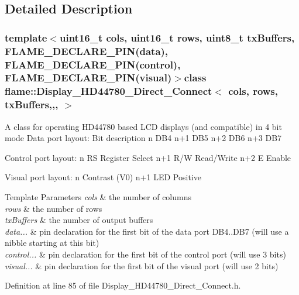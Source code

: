 \subsection{Detailed Description}
\subsubsection*{template$<$uint16\-\_\-t cols, uint16\-\_\-t rows, uint8\-\_\-t tx\-Buffers, F\-L\-A\-M\-E\-\_\-\-D\-E\-C\-L\-A\-R\-E\-\_\-\-P\-I\-N(data), F\-L\-A\-M\-E\-\_\-\-D\-E\-C\-L\-A\-R\-E\-\_\-\-P\-I\-N(control), F\-L\-A\-M\-E\-\_\-\-D\-E\-C\-L\-A\-R\-E\-\_\-\-P\-I\-N(visual)$>$class flame\-::\-Display\-\_\-\-H\-D44780\-\_\-\-Direct\-\_\-\-Connect$<$ cols, rows, tx\-Buffers,,, $>$}

A class for operating H\-D44780 based L\-C\-D displays (and compatible) in 4 bit mode Data port layout\-: Bit description n D\-B4 n+1 D\-B5 n+2 D\-B6 n+3 D\-B7

Control port layout\-: n R\-S Register Select n+1 R/\-W Read/\-Write n+2 E Enable

Visual port layout\-: n Contrast (V0) n+1 L\-E\-D Positive


\begin{DoxyTemplParams}{Template Parameters}
{\em cols} & the number of columns \\
\hline
{\em rows} & the number of rows \\
\hline
{\em tx\-Buffers} & the number of output buffers \\
\hline
{\em data...} & pin declaration for the first bit of the data port D\-B4..D\-B7 (will use a nibble starting at this bit) \\
\hline
{\em control...} & pin declaration for the first bit of the control port (will use 3 bits) \\
\hline
{\em visual...} & pin declaration for the first bit of the visual port (will use 2 bits) \\
\hline
\end{DoxyTemplParams}


Definition at line 85 of file Display\-\_\-\-H\-D44780\-\_\-\-Direct\-\_\-\-Connect.\-h.




